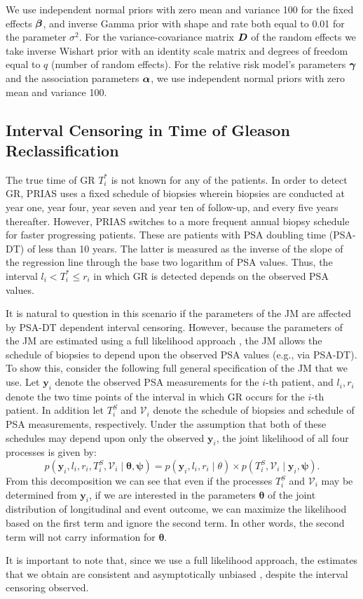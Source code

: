 We use independent normal priors with zero mean and variance 100 for the fixed effects $\boldsymbol{\beta}$, and inverse Gamma prior with shape and rate both equal to 0.01 for the parameter $\sigma^2$. For the variance-covariance matrix $\boldsymbol{D}$ of the random effects we take inverse Wishart prior with an identity scale matrix and degrees of freedom equal to $q$ (number of random effects). For the relative risk model's parameters $\boldsymbol{\gamma}$ and the association parameters $\boldsymbol{\alpha}$, we use independent normal priors with zero mean and variance 100.

\clearpage
\subsection{Interval Censoring in Time of Gleason Reclassification}
\label{subsec : int_censoring_fulllikelihood_proof}
The true time of GR $T^*_i$ is not known for any of the patients. In order to detect GR, PRIAS uses a fixed schedule of biopsies wherein biopsies are conducted at year one, year four, year seven and year ten of follow-up, and every five years thereafter. However, PRIAS switches to a more frequent annual biopsy schedule for faster progressing patients. These are patients with PSA doubling time (PSA-DT) of less than 10 years. The latter is measured as the inverse of the slope of the regression line through the base two logarithm of PSA values. Thus, the interval $l_i < T_i^* \leq r_i$ in which GR is detected depends on the observed PSA values. 

It is natural to question in this scenario if the parameters of the JM are affected by PSA-DT dependent interval censoring. However, because the parameters of the JM are estimated using a full likelihood approach \citep{tsiatis2004joint}, the JM allows the schedule of biopsies to depend upon the observed PSA values (e.g., via PSA-DT). To show this, consider the following full general specification of the JM that we use. Let $\boldsymbol{y}_i$ denote the observed PSA measurements for the $i$-th patient, and $l_i, r_i$ denote the two time points of the interval in which GR occurs for the $i$-th patient. In addition let $T_i^S$ and $\mathcal{V}_i$ denote the schedule of biopsies and schedule of PSA measurements, respectively. Under the assumption that both of these schedules may depend upon only the observed $\boldsymbol{y}_i$, the joint likelihood of all four processes is given by:
\begin{equation}
p(\boldsymbol{y}_i, l_i, r_i, T_i^S, \mathcal{V}_i \mid \boldsymbol{\theta}, \boldsymbol{\psi}) = p(\boldsymbol{y}_i, l_i, r_i \mid \theta) \times p(T_i^S, \mathcal{V}_i \mid \boldsymbol{y}_i, \boldsymbol{\psi}).
\end{equation}
From this decomposition we can see that even if the processes $T_i^S$ and $\mathcal{V}_i$ may be determined from $\boldsymbol{y}_i$, if we are interested in the parameters $\boldsymbol{\theta}$ of the joint distribution of longitudinal and event outcome, we can maximize the likelihood based on the first term and ignore the second term. In other words, the second term will not carry information for $\boldsymbol{\theta}$.

It is important to note that, since we use a full likelihood approach, the estimates that we obtain are consistent and asymptotically unbiased \citep{gentleman1994maximum}, despite the interval censoring observed. 
